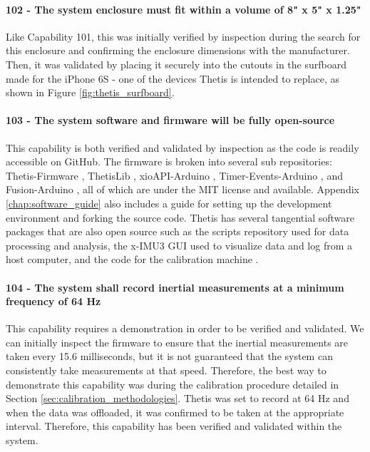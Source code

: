 \paragraph*{102 - The system enclosure must fit within a volume of 8" x 5" x 1.25"} Like Capability 101, this was initially verified by inspection during the search for this enclosure and confirming the enclosure dimensions with the manufacturer.
Then, it was validated by placing it securely into the cutouts in the surfboard made for the iPhone 6S - one of the devices Thetis is intended to replace, as shown in Figure \ref{fig:thetis_surfboard}.

\paragraph*{103 - The system software and firmware will be fully open-source} This capability is both verified and validated by inspection as the code is readily accessible on GitHub.
The firmware is broken into several sub repositories: Thetis-Firmware \cite{Thetis-Firmware}, ThetisLib \cite{ThetisLib}, xioAPI-Arduino \cite{xioAPI-Arduino}, Timer-Events-Arduino \cite{Timer-Events-Arduino}, and Fusion-Arduino \cite{Fusion-Arduino}, all of which are under the MIT license and available.
Appendix \ref{chap:software_guide} also includes a guide for setting up the development environment and forking the source code.
Thetis has several tangential software packages that are also open source such as the scripts repository \cite{Thetis-Scripts} used for data processing and analysis, the x-IMU3 GUI \cite{x-IMU3-Software} used to visualize data and log from a host computer, and the code for the calibration machine \cite{Thetis-Calibration}.

\paragraph*{104 - The system shall record inertial measurements at a minimum frequency of 64 Hz} This capability requires a demonstration in order to be verified and validated.
We can initially inspect the firmware to ensure that the inertial measurements are taken every 15.6 milliseconds, but it is not guaranteed that the system can consistently take measurements at that speed.
Therefore, the best way to demonstrate this capability was during the calibration procedure detailed in Section \ref{sec:calibration_methodologies}.
Thetis was set to record at 64 Hz and when the data was offloaded, it was confirmed to be taken at the appropriate interval.
Therefore, this capability has been verified and validated within the system.

